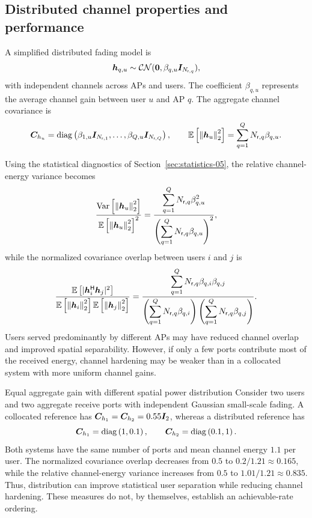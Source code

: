 \subsection{Distributed channel properties and performance}
A simplified distributed fading model is
\begin{equation*}
	\bm{h}_{q,u}\sim
	\mathcal{CN}(\bm{0},\beta_{q,u}\bm{I}_{N_{\mathsf r,q}}),
\end{equation*}
with independent channels across APs and users. The coefficient $\beta_{q,u}$ represents the average channel gain between user $u$ and AP $q$. The aggregate channel covariance is
\begin{equation}
	\bm{C}_{h_u}
	=\operatorname{diag}\left(\beta_{1,u}\bm{I}_{N_{\mathsf r,1}},
		\ldots,\beta_{Q,u}\bm{I}_{N_{\mathsf r,Q}}\right),
	\qquad
	\mathbb{E}\left[\left\|\bm{h}_u\right\|_2^2\right]
	=\sum_{q=1}^{Q}N_{\mathsf r,q}\beta_{q,u}.
	\label{eq:distributedcov-05}
\end{equation}

Using the statistical diagnostics of Section~\ref{sec:statistics-05}, the relative channel-energy variance becomes
\begin{equation}
	\frac{\operatorname{Var}\left[\left\|\bm{h}_u\right\|_2^2\right]}
	{\mathbb{E}\left[\left\|\bm{h}_u\right\|_2^2\right]^2}
	=\frac{\displaystyle\sum_{q=1}^{Q}
		N_{\mathsf r,q}\beta_{q,u}^2}
	{\left(\displaystyle\sum_{q=1}^{Q}
		N_{\mathsf r,q}\beta_{q,u}\right)^2},
	\label{eq:distributedhard-05}
\end{equation}
while the normalized covariance overlap between users $i$ and $j$ is
\begin{equation}
	\frac{\mathbb{E}\left[|{\bm{h}}^{\mathsf{H}}_i\bm{h}_j|^2\right]}
	{\mathbb{E}\left[\left\|\bm{h}_i\right\|_2^2\right]\mathbb{E}\left[\left\|\bm{h}_j\right\|_2^2\right]}
	=\frac{\displaystyle\sum_{q=1}^{Q}
		N_{\mathsf r,q}\beta_{q,i}\beta_{q,j}}
	{\left(\displaystyle\sum_{q=1}^{Q}N_{\mathsf r,q}\beta_{q,i}\right)
		\left(\displaystyle\sum_{q=1}^{Q}N_{\mathsf r,q}\beta_{q,j}\right)}.
	\label{eq:distributedoverlap-05}
\end{equation}
Users served predominantly by different APs may have reduced channel overlap and improved spatial separability. However, if only a few ports contribute most of the received energy, channel hardening may be weaker than in a collocated system with more uniform channel gains.

\begin{example}{Equal aggregate gain with different spatial power distribution}
	Consider two users and two aggregate receive ports with independent Gaussian small-scale fading. A collocated reference has $\bm{C}_{h_1}=\bm{C}_{h_2}=0.55\bm{I}_2$, whereas a distributed reference has
	\begin{equation*}
		\bm{C}_{h_1}=\operatorname{diag}\left(1,0.1\right),
		\qquad
		\bm{C}_{h_2}=\operatorname{diag}\left(0.1,1\right).
	\end{equation*}
	Both systems have the same number of ports and mean channel energy $1.1$ per user. The normalized covariance overlap decreases from $0.5$ to $0.2/1.21\approx0.165$, while the relative channel-energy variance increases from $0.5$ to $1.01/1.21\approx0.835$. Thus, distribution can improve statistical user separation while reducing channel hardening. These measures do not, by themselves, establish an achievable-rate ordering.
\end{example}

